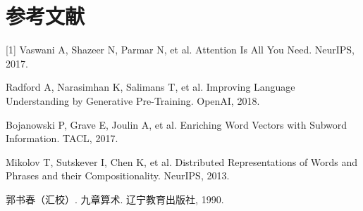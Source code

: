 \documentclass[UTF8,a4paper,twocolumn]{ctexart}
\begin{document}
\section{参考文献}
[1] Vaswani A, Shazeer N, Parmar N, et al. Attention Is All You Need. NeurIPS, 2017.\par
[2] Radford A, Narasimhan K, Salimans T, et al. Improving Language Understanding by Generative Pre-Training. OpenAI, 2018.\par
[3] Bojanowski P, Grave E, Joulin A, et al. Enriching Word Vectors with Subword Information. TACL, 2017.\par
[4] Mikolov T, Sutskever I, Chen K, et al. Distributed Representations of Words and Phrases and their Compositionality. NeurIPS, 2013.\par
[5] 郭书春（汇校）. 九章算术. 辽宁教育出版社, 1990.
\end{document}
